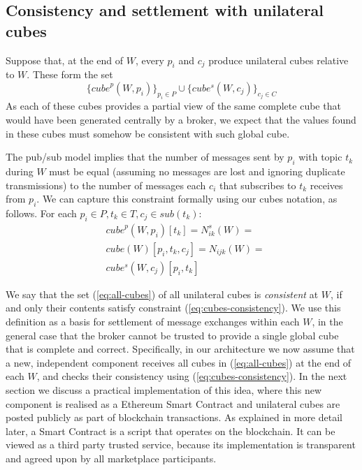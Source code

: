 \documentclass[conference]{IEEEtran}
\begin{document}
\subsection{Consistency and settlement with unilateral cubes}

Suppose that, at the end of $W$, every $p_i$ and $c_j$ produce  unilateral cubes relative to $W$. 
These form the set
\begin{equation}\label{eq:all-cubes}
\{ \mathit{cube}^p(W, p_i) \}_{p_i \in P}\cup \{\mathit{cube^s}(W, c_j) \}_{c_j \in C} 
\end{equation}
As each of these cubes provides a partial view of the same complete cube that would have been generated centrally by a broker, we expect that the values found in these cubes must somehow be consistent with such global cube.

The pub/sub model implies that the number of messages sent by $p_i$ with topic $t_k$ during $W$ must be equal (assuming no messages are lost and ignoring duplicate transmissions) to the number of messages each $c_i$ that subscribes to $t_k$ receives from $p_i$. 
We can capture this constraint formally using our cubes notation, as follows.
%
For each $ p_i \in P, t_k \in T, c_j \in \mathit{sub}(t_k)$:
\begin{equation}\label{eq:cubes-consistency}
\begin{split}
& \mathit{cube}^p(W, p_i)[t_k] = N^s_{ik}(W) = \\
& \mathit{cube}(W)[p_i, t_k, c_j]  = N_{ijk}(W) = \\
& \mathit{cube^s}(W, c_j)[p_i, t_k]
\end{split}
\end{equation}

We say that the set (\ref{eq:all-cubes}) of all unilateral cubes is \textit{consistent} at $W$, if and only their contents satisfy constraint (\ref{eq:cubes-consistency}).
We use this definition as a basis for settlement of message exchanges within each $W$, in the general case that the broker cannot be trusted to provide a single global cube that is complete and correct.
%
Specifically, in our architecture we  now assume that a new, independent component receives all cubes in (\ref{eq:all-cubes}) at the end of each $W$, and checks their consistency using (\ref{eq:cubes-consistency}). 
In the next section we discuss a practical implementation of this idea, where this new component is realised as a Ethereum Smart Contract and unilateral cubes are posted publicly as part of blockchain transactions. As explained in more detail later, a Smart Contract is a script that operates on the blockchain. It can be viewed as a third party trusted service, because its implementation is transparent and agreed upon by all marketplace participants. 
\end{document}
